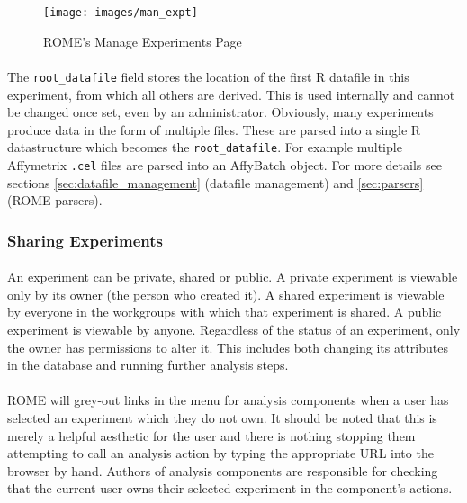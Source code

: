 \begin{figure}
\centering
\caption{ROME's Manage Experiments Page}\label{fig:man_expt}
\texttt{[image: images/man\_expt]}
\end{figure}


\paragraph{}
The \texttt{root\_datafile} field stores the location of the first R datafile in this experiment, from which all others are derived. This is used internally and cannot be changed once set, even by an administrator. Obviously, many experiments produce data in the form of multiple files. These are parsed into a single R datastructure which becomes the \texttt{root\_datafile}. For example multiple Affymetrix \texttt{.cel} files are parsed into an AffyBatch object. For more details see sections \ref{sec:datafile_management} (datafile management) and \ref{sec:parsers} (ROME parsers).

\subsubsection{Sharing Experiments}
\label{sec:sharing}

\paragraph{}
An experiment can be private, shared or public. A private experiment is viewable only by its owner (the person who created it). A shared experiment is viewable by everyone in the workgroups with which that experiment is shared. A public experiment is viewable by anyone. Regardless of the status of an experiment, only the owner has permissions to alter it. This includes both changing its attributes in the database and running further analysis steps.

\paragraph*{}
ROME will grey-out links in the menu for analysis components when a user has selected an experiment which they do not own. It should be noted that this is merely a helpful aesthetic for the user and there is nothing stopping them attempting to call an analysis action by typing the appropriate URL into the browser by hand. Authors of analysis components are responsible for checking that the current user owns their selected experiment in the component's actions.

